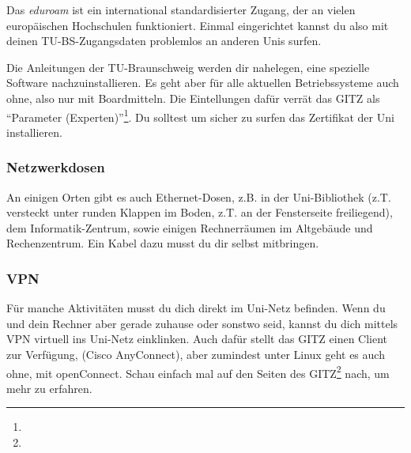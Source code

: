 		Das \emph{eduroam} ist ein international standardisierter Zugang, der an vielen europäischen Hochschulen funktioniert. Einmal eingerichtet kannst du also mit deinen TU-BS-Zugangsdaten problemlos an anderen Unis surfen.

		Die Anleitungen der TU-Braunschweig werden dir nahelegen, eine spezielle Software nachzuinstallieren. 
    Es geht aber für alle aktuellen Betriebssysteme auch ohne, also nur mit Boardmitteln.
    Die Eintellungen dafür verrät das GITZ als \enquote{Parameter (Experten)}\footnote{}.
    Du solltest um sicher zu surfen das Zertifikat der Uni installieren.

    \subsubsection{Netzwerkdosen}
		An einigen Orten gibt es auch Ethernet-Dosen, z.B. in der Uni-Bibliothek (z.T. versteckt unter runden Klappen im Boden, z.T. an der Fensterseite freiliegend), dem Informatik-Zentrum, sowie einigen Rechnerräumen im Altgebäude und Rechenzentrum. Ein Kabel dazu musst du dir selbst mitbringen.

    \subsubsection{VPN}
    Für manche Aktivitäten musst du dich direkt im Uni-Netz befinden. 
    Wenn du und dein Rechner aber gerade zuhause oder sonstwo seid, kannst du dich mittels VPN virtuell ins Uni-Netz einklinken. 
    Auch dafür stellt das GITZ einen Client zur Verfügung, (Cisco AnyConnect), aber zumindest unter Linux geht es auch ohne, mit openConnect.
    Schau einfach mal auf den Seiten des GITZ\footnote{} nach, um mehr zu erfahren.
